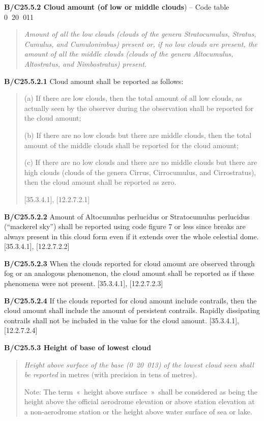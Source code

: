 \textbf{B/C25.5.2 Cloud amount (of low or middle clouds}) -- Code table 0\textbf{~}20\textbf{~}011

\begin{quote}
\emph{Amount of all the low clouds (clouds of the genera Stratocumulus, Stratus, Cumulus, and Cumulonimbus) present or, if no low clouds are present, the amount of all the middle clouds (clouds of the genera Altocumulus, Altostratus, and Nimbostratus) present}.
\end{quote}

\textbf{B/C25.5.2.1} Cloud amount shall be reported as follows:

\begin{quote}
(a) If there are low clouds, then the total amount of all low clouds, as actually seen by the observer during the observation shall be reported for the cloud amount;

(b) If there are no low clouds but there are middle clouds, then the total amount of the middle clouds shall be reported for the cloud amount;

(c) If there are no low clouds and there are no middle clouds but there are high clouds (clouds of the genera Cirrus, Cirrocumulus, and Cirrostratus), then the cloud amount shall be reported as zero.

{[}35.3.4.1{]}, {[}12.2.7.2.1{]}
\end{quote}

\textbf{B/C25.5.2.2} Amount of Altocumulus perlucidus or Stratocumulus perlucidus (``mackerel sky'') shall be reported using code figure 7 or less since breaks are always present in this cloud form even if it extends over the whole celestial dome. {[}35.3.4.1{]}, {[}12.2.7.2.2{]}

\textbf{B/C25.5.2.3} When the clouds reported for cloud amount are observed through fog or an analogous phenomenon, the cloud amount shall be reported as if these phenomena were not present. {[}35.3.4.1{]}, {[}12.2.7.2.3{]}

\textbf{B/C25.5.2.4} If the clouds reported for cloud amount include contrails, then the cloud amount shall include the amount of persistent contrails. Rapidly dissipating contrails shall not be included in the value for the cloud amount. {[}35.3.4.1{]}, {[}12.2.7.2.4{]}

\textbf{B/C25.5.3 Height of base of lowest cloud}

\begin{quote}
\emph{Height above surface of the base (0~20~013) of the lowest cloud seen shall be reported} in metres (with precision in tens of metres).

Note: The term~«~height above surface~»~shall be considered as being the height above the official aerodrome elevation or above station elevation at a non-aerodrome station or the height above water surface of sea or lake.
\end{quote}

